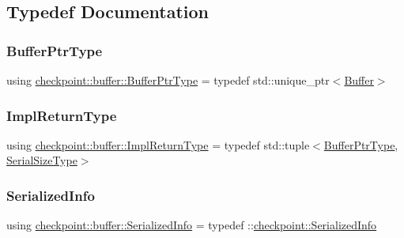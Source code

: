 \subsection{Typedef Documentation}
\mbox{\label{namespacecheckpoint_1_1buffer_ac52efd71a39aafa616d8214a7ff96ace}} 
\subsubsection{\texorpdfstring{Buffer\+Ptr\+Type}{BufferPtrType}}
{\footnotesize\ttfamily using \hyperlink{namespacecheckpoint_1_1buffer_ac52efd71a39aafa616d8214a7ff96ace}{checkpoint\+::buffer\+::\+Buffer\+Ptr\+Type} = typedef std\+::unique\+\_\+ptr$<$\hyperlink{structcheckpoint_1_1buffer_1_1_buffer}{Buffer}$>$}

\mbox{\label{namespacecheckpoint_1_1buffer_a4e930737a23dabd17333a8ea48c8edff}} 
\subsubsection{\texorpdfstring{Impl\+Return\+Type}{ImplReturnType}}
{\footnotesize\ttfamily using \hyperlink{namespacecheckpoint_1_1buffer_a4e930737a23dabd17333a8ea48c8edff}{checkpoint\+::buffer\+::\+Impl\+Return\+Type} = typedef std\+::tuple$<$\hyperlink{namespacecheckpoint_1_1buffer_ac52efd71a39aafa616d8214a7ff96ace}{Buffer\+Ptr\+Type}, \hyperlink{namespacecheckpoint_a083f6674da3f94c2901b18c6d238217c}{Serial\+Size\+Type}$>$}

\mbox{\label{namespacecheckpoint_1_1buffer_a7c7e5ecf5f571c68818f608989764ab7}} 
\subsubsection{\texorpdfstring{Serialized\+Info}{SerializedInfo}}
{\footnotesize\ttfamily using \hyperlink{namespacecheckpoint_1_1buffer_a7c7e5ecf5f571c68818f608989764ab7}{checkpoint\+::buffer\+::\+Serialized\+Info} = typedef \+::\hyperlink{structcheckpoint_1_1_serialized_info}{checkpoint\+::\+Serialized\+Info}}

